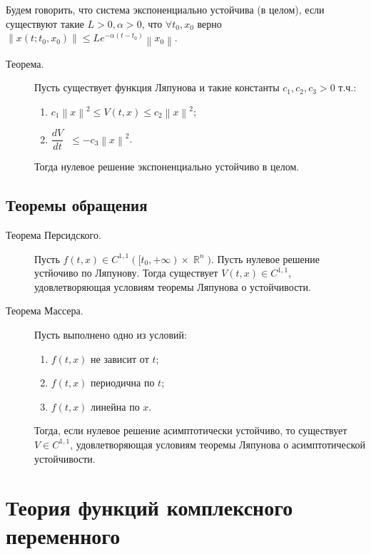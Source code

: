 \documentclass[a4paper,12pt]{scrartcl}
\DeclareMathOperator{\bbr}{\mathbb{R}}
\DeclareMathOperator{\stick}{\biggl|}
\newcommand{\norm}[1]{\left\lVert #1 \right\rVert}
\begin{document}
Будем говорить, что система экспоненциально устойчива (в целом), если существуют такие $L>0,\alpha>0$, что $\forall t_0,x_0$ верно $\norm{x(t;t_0,x_0)}\leqslant Le^{-\alpha(t-t_0)}\norm{x_0}$.
\begin{description}
 \item[Теорема.] Пусть существует функция Ляпунова и такие константы $c_1,c_2,c_3>0$ т.ч.:
\begin{enumerate}
 \item $c_1\norm{x}^2\leqslant V(t,x) \leqslant c_2\norm{x}^2$; 
 \item $\dfrac{dV}{dt}\stick \leqslant -c_3\norm{x}^2$.
\end{enumerate}
Тогда нулевое решение экспоненциально устойчиво в целом. 
\end{description}

\subsection{Теоремы обращения}
\begin{description}
 \item[Теорема Персидского.] Пусть $f(t,x)\in C^{1,1}([t_0,+\infty)\times\bbr^n)$. Пусть нулевое решение устйочиво по Ляпунову. Тогда существует $V(t,x)\in C^{1,1}$, удовлетворяющая условиям теоремы Ляпунова о устойчивости.
 \item[Теорема Массера.] Пусть выполнено одно из условий:
\begin{enumerate}
\item $f(t,x)$ не зависит от $t$;
\item $f(t,x)$ периодична по $t$;
\item $f(t,x)$ линейна по $x$.
\end{enumerate}
Тогда, если нулевое решение асимптотически устойчиво, то существует $V\in C^{1,1}$, удовлетворяющая условиям теоремы Ляпунова о асимптотической устойчивости.
\end{description}
\section{Теория функций комплексного переменного}
\end{document}
